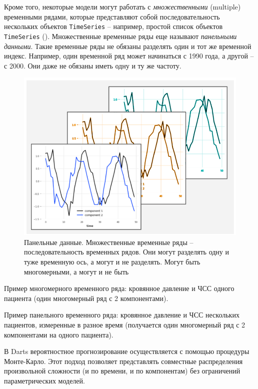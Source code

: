 \documentclass[%
	11pt,
	a4paper,
	utf8,
		]{article}
\begin{document}
Кроме того, некоторые модели могут работать с \emph{множественными} (multiple) временными рядами, которые представляют собой последовательность нескольких объектов \verb|TimeSeries| -- например, простой список объектов \verb|TimeSeries| (). Множественные временные ряды еще называют \emph{панельными данными}. Такие временные ряды не обязаны разделять один и тот же временной индекс. Например, один временной ряд может начинаться с 1990 года, а другой -- с 2000. Они даже не обязаны иметь одну и ту же частоту. 

\begin{figure}[h]
	\centering
	\includegraphics[scale=0.8]{figures/multiple.png}
	\caption{ Панельные данные. Множественные временные ряды -- последовательность временных рядов. Они могут разделять одну и туже временную ось, а могут и не разделять. Могут быть многомерными, а могут и не быть }\label{fig:multiple}
\end{figure}

Пример многомерного временного ряда: кровянное давление и ЧСС одного пациента (один многомерный ряд с 2 компонентами).

Пример панельного временного ряда: кровянное давление и ЧСС нескольких пациентов, измеренные в разное время (получается один многомерный ряд с 2 компонентами на одного пациента).

В Darts вероятностное прогнозирование осуществляется с помощью процедуры Монте-Карло. Этот подход позволяет представлять совместные распределения произвольной сложности (и по времени, и по компонентам) без ограничений параметрических моделей.
\end{document}
